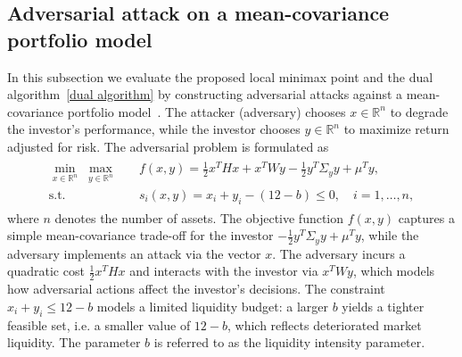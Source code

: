 \documentclass{article}
\begin{document}
	\subsection{Adversarial attack on a mean-covariance portfolio model}
	In this subsection we evaluate the proposed local minimax point and the dual algorithm~\ref{dual algorithm} by constructing adversarial attacks against a mean-covariance portfolio model~\cite{markowitzPortfolioSelection1952,mertonAnalyticDerivationEfficient1972}. The attacker (adversary) chooses $x\in\mathbb{R}^{n}$ to degrade the investor's performance, while the investor chooses $y\in\mathbb{R}^{n}$ to maximize return adjusted for risk. The adversarial problem is formulated as
	\begin{align}\label{eq:attack}
		\begin{aligned}
			\min_{x\in\mathbb{R}^{n}}\;\max_{y\in\mathbb{R}^{n}}\quad & f(x,y)
			= \frac{1}{2}x^{T}Hx + x^{T}W y - \frac{1}{2}y^{T}\Sigma_{y}y + \mu^{T}y,\\
			\text{s.t.}\quad & s_{i}(x,y) = x_{i} + y_{i} - (12 - b) \leq 0,\quad i=1,\dots,n,
		\end{aligned}
	\end{align}
	where $n$ denotes the number of assets. The objective function $f(x,y)$ captures a simple mean-covariance trade-off for the investor $-\frac{1}{2} y^{T}\Sigma_{y}y + \mu^{T}y$, while the adversary implements an attack via the vector $x$. The adversary incurs a quadratic cost $\frac{1}{2}x^{T}Hx$ and interacts with the investor via $x^{T}Wy$, which models how adversarial actions affect the investor's decisions. The constraint $x_{i}+y_{i}\le 12-b$ models a limited liquidity budget: a larger $b$ yields a tighter feasible set, i.e. a smaller value of $12-b$, which reflects deteriorated market liquidity. The parameter $b$ is referred to as the liquidity intensity parameter.
	
\end{document}
